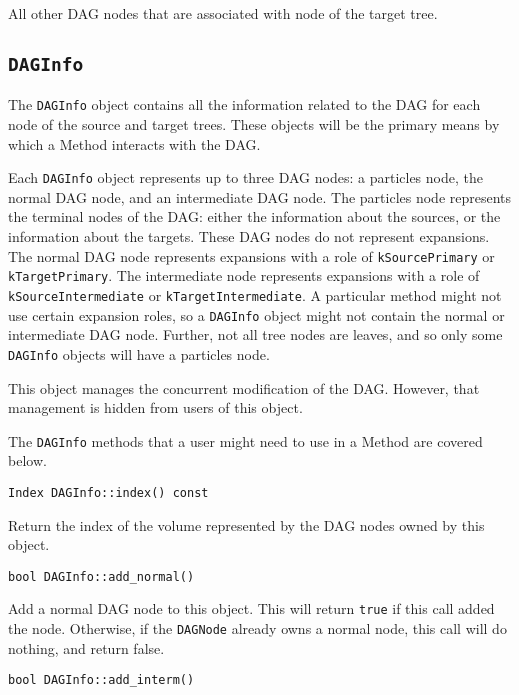\noindent All other DAG nodes that are associated with node of the target tree.



\subsection{\texttt{DAGInfo}}

The \texttt{DAGInfo} object contains all the information related to the DAG
for each node of the source and target trees. These objects will be the
primary means by which a Method interacts with the DAG.

Each \texttt{DAGInfo} object represents up to three DAG nodes: a particles
node, the normal DAG node, and an intermediate DAG node. The particles node
represents the terminal nodes of the DAG: either the information about
the sources, or the information about the targets. These DAG nodes do not
represent expansions. The normal
DAG node represents expansions with a role of \texttt{kSourcePrimary} or
\texttt{kTargetPrimary}. The intermediate node represents expansions with a
role of \texttt{kSourceIntermediate} or \texttt{kTargetIntermediate}. A
particular method might not use certain expansion roles, so a
\texttt{DAGInfo} object might not contain the normal or intermediate DAG node.
Further, not all tree nodes are leaves, and so only some \texttt{DAGInfo}
objects will have a particles node.

This object manages the concurrent modification of the DAG. However, that
management is hidden from users of this object.

The \texttt{DAGInfo} methods that a user might need to use in a Method are
covered below.

\begin{lstlisting}
Index DAGInfo::index() const
\end{lstlisting}

\noindent Return the index of the volume represented by the DAG nodes owned by
this object.

\begin{lstlisting}
bool DAGInfo::add_normal()
\end{lstlisting}

\noindent Add a normal DAG node to this object. This will return \texttt{true}
if this call added the node. Otherwise, if the \texttt{DAGNode} already owns a
normal node, this call will do nothing, and return false.

\begin{lstlisting}
bool DAGInfo::add_interm()
\end{lstlisting}

